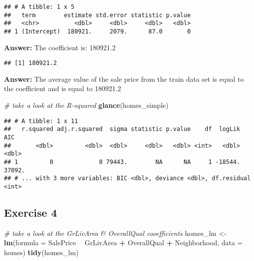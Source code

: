 \documentclass[]{article}
\newenvironment{Shaded}{\begin{snugshade}}{\end{snugshade}}
\newcommand{\KeywordTok}[1]{\textcolor[rgb]{0.13,0.29,0.53}{\textbf{#1}}}
\newcommand{\DataTypeTok}[1]{\textcolor[rgb]{0.13,0.29,0.53}{#1}}
\newcommand{\StringTok}[1]{\textcolor[rgb]{0.31,0.60,0.02}{#1}}
\newcommand{\CommentTok}[1]{\textcolor[rgb]{0.56,0.35,0.01}{\textit{#1}}}
\newcommand{\OperatorTok}[1]{\textcolor[rgb]{0.81,0.36,0.00}{\textbf{#1}}}
\newcommand{\NormalTok}[1]{#1}
\begin{document}
\begin{verbatim}
## # A tibble: 1 x 5
##   term        estimate std.error statistic p.value
##   <chr>          <dbl>     <dbl>     <dbl>   <dbl>
## 1 (Intercept)  180921.     2079.      87.0       0
\end{verbatim}

\textbf{Answer:} The coefficient is: 180921.2

\begin{Shaded}
\end{Shaded}

\begin{verbatim}
## [1] 180921.2
\end{verbatim}

\textbf{Answer:} The average value of the sale price from the train data
set is equal to the coefficient and is equal to 180921.2

\begin{Shaded}
\begin{Highlighting}[]
\CommentTok{# take a look at the R-squared}
\KeywordTok{glance}\NormalTok{(homes_simple)}
\end{Highlighting}
\end{Shaded}

\begin{verbatim}
## # A tibble: 1 x 11
##   r.squared adj.r.squared  sigma statistic p.value    df  logLik    AIC
##       <dbl>         <dbl>  <dbl>     <dbl>   <dbl> <int>   <dbl>  <dbl>
## 1         0             0 79443.        NA      NA     1 -18544. 37092.
## # ... with 3 more variables: BIC <dbl>, deviance <dbl>, df.residual <int>
\end{verbatim}

\subsection{Exercise 4}\label{exercise-4}

\begin{Shaded}
\begin{Highlighting}[]
\CommentTok{# take a look at the GrLivArea & OverallQual cooefficients}
\NormalTok{homes_lm <-}\StringTok{ }\KeywordTok{lm}\NormalTok{(}\DataTypeTok{formula =}\NormalTok{ SalePrice }\OperatorTok{~}\StringTok{ }\NormalTok{GrLivArea }\OperatorTok{+}\StringTok{ }\NormalTok{OverallQual }\OperatorTok{+}\StringTok{ }\NormalTok{Neighborhood, }\DataTypeTok{data =}\NormalTok{ homes)}
\KeywordTok{tidy}\NormalTok{(homes_lm)}
\end{Highlighting}
\end{Shaded}
\end{document}
